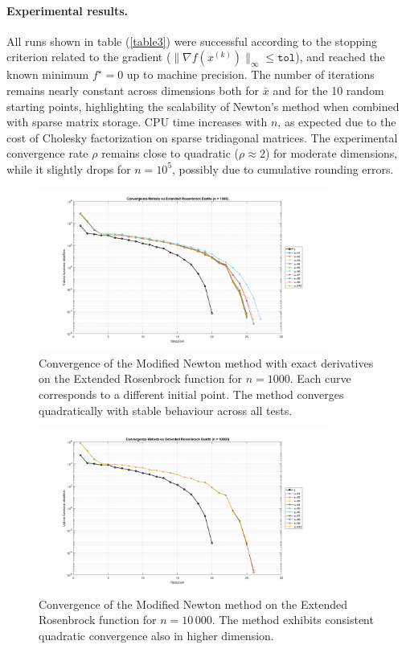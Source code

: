 \documentclass[a4paper,12pt]{article}
\begin{document}
	 \paragraph{Experimental results.}All runs shown in table (\ref{table3}) were successful according to the stopping criterion related to the gradient (\( \|\nabla f(x^{(k)})\|_\infty \leq \texttt{tol}\)), and reached the known minimum \( f^\star = 0 \) up to machine precision. The number of iterations remains nearly constant across dimensions both for $\bar{x}$ and for the 10 random starting points, highlighting the scalability of Newton’s method when combined with sparse matrix storage. CPU time increases with \(n\), as expected due to the cost of Cholesky factorization on sparse tridiagonal matrices. The experimental convergence rate \(\rho\) remains close to quadratic (\(\rho \approx 2\)) for moderate dimensions, while it slightly drops for \(n=10^5\), possibly due to cumulative rounding errors.
	
	
	\begin{figure}[H]%
		\centering
		\includegraphics[width=0.85\textwidth]{../immagini/ext_1k.png}
		\caption{Convergence of the Modified Newton method with exact derivatives on the Extended Rosenbrock function for $n=1000$. Each curve corresponds to a different initial point. The method converges quadratically with stable behaviour across all tests.}
		\label{fig:extnewton_1k}
	\end{figure}
	
	\begin{figure}[H]%
		\centering
		\includegraphics[width=0.85\textwidth]{../immagini/ext_10k.png}
		\caption{Convergence of the Modified Newton method on the Extended Rosenbrock function for $n=10\,000$. The method exhibits consistent quadratic convergence also in higher dimension.}
		\label{fig:extnewton_10k}
	\end{figure}
	
\end{document}
